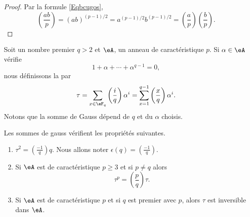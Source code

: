 \begin{proof}
    Par la formule \eqref{Eqbcugos},
    \begin{equation}
        \left(\frac{ab}{p}\right)=(ab)^{(p-1)/2}=a^{(p-1)/2}b^{(p-1)/2}=\left(\frac{a}{p}\right)\left(\frac{b}{p}\right).
    \end{equation}
\end{proof}

Soit un nombre premier \( q>2\) et \( \eA\), un anneau de caractéristique \( p\). Si \( \alpha\in \eA\) vérifie
\begin{equation}
    1+\alpha+\cdots+\alpha^{q-1}=0,
\end{equation}
nous définissons la  par
\begin{equation}
    \tau=\sum_{x\in \eF_q}\left(\frac{i}{q}\right)\alpha^i=\sum_{x=1}^{q-1}\left(\frac{x}{q}\right)\alpha^i.
\end{equation}
Notons que la somme de Gauss dépend de \( q\) et du \( \alpha\) choisis.

\begin{proposition} \label{PropciRUov}
    Les sommes de gauss vérifient les propriétés suivantes.
    \begin{enumerate}
        \item
            $\tau^2=\left(\frac{-1}{q}\right)q$. Nous allons noter \( \epsilon(q)=\left(\frac{-1}{q}\right)\).

        \item
            Si \( \eA\) est de caractéristique \( p\geq 3\) et si \( p\neq q\) alors
            \begin{equation}    \label{EqxBNpJz}
                \tau^p=\left(\frac{p}{q}\right)\tau.
            \end{equation}
        \item
            Si \( \eA\) est de caractéristique \( p\) et si \( q\) est premier avec \( p\), alors \( \tau\) est inversible dans \( \eA\).
    \end{enumerate}
\end{proposition}

